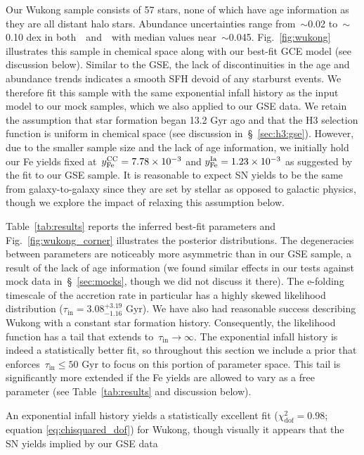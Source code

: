 \documentclass[ms.tex]{subfiles}
\begin{document}
Our Wukong sample consists of 57 stars, none of which have age information as
they are all distant halo stars.
Abundance uncertainties range from~$\sim$0.02 to~$\sim$0.10 dex in
both~\afe~and~\feh~with median values near~$\sim$0.045.
Fig.~\ref{fig:wukong} illustrates this sample in chemical space along with our
best-fit GCE model (see discussion below).
Similar to the GSE, the lack of discontinuities in the age and abundance trends
indicates a smooth SFH devoid of any starburst events.
We therefore fit this sample with the same exponential infall history as the
input model to our mock samples, which we also applied to our GSE data.
We retain the assumption that star formation began 13.2 Gyr ago and that the H3
selection function is uniform in chemical space (see discussion
in~\S~\ref{sec:h3:gse}).
However, due to the smaller sample size and the lack of age information, we
initially hold our Fe yields fixed at~$y_\text{Fe}^\text{CC} = 7.78\times10^{-3}$ and
$y_\text{Fe}^\text{Ia} = 1.23\times10^{-3}$ as suggested by the fit to our GSE sample.
It is reasonable to expect SN yields to be the same from galaxy-to-galaxy since
they are set by stellar as opposed to galactic physics, though we explore the
impact of relaxing this assumption below.
\par
Table~\ref{tab:results} reports the inferred best-fit parameters and
Fig.~\ref{fig:wukong_corner} illustrates the posterior distributions.
The degeneracies between parameters are noticeably more asymmetric than in our
GSE sample, a result of the lack of age information (we found similar effects
in our tests against mock data in~\S~\ref{sec:mocks}, though we did not discuss
it there).
The e-folding timescale of the accretion rate in particular has a highly skewed
likelihood distribution ($\tau_\text{in} = 3.08^{+3.19}_{-1.16}$ Gyr).
We have also had reasonable success describing Wukong with a constant star
formation history.
Consequently, the likelihood function has a tail that extends
to~$\tau_\text{in} \rightarrow \infty$.
The exponential infall history is indeed a statistically better fit, so
throughout this section we include a prior that
enforces~$\tau_\text{in} \leq 50$ Gyr to focus on this portion of parameter
space.
This tail is significantly more extended if the Fe yields are allowed to vary
as a free parameter (see Table~\ref{tab:results} and discussion below).
\par
An exponential infall history yields a statistically excellent fit
($\chi_\text{dof}^2 = 0.98$; equation \ref{eq:chisquared_dof}) for Wukong,
though visually it appears that the SN yields implied by our GSE data
\end{document}
